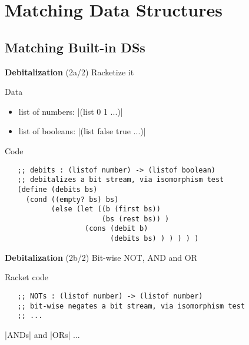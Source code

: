 \documentclass[12pt]{beamer}
\begin{document}
\section{Matching Data Structures}

\subsection{Matching Built-in DSs}

\begin{frame}[fragile]{{\bf Debitalization} (2a/2)}
 Racketize it

 \pause

 Data
 \begin{itemize}
  \item list of numbers: |(list 0 1 ...)|
  \item list of booleans: |(list false true ...)|
 \end{itemize}

 \pause

 Code
 {\scriptsize
  \begin{verbatim}
   ;; debits : (listof number) -> (listof boolean)
   ;; debitalizes a bit stream, via isomorphism test
   (define (debits bs)
     (cond ((empty? bs) bs)
           (else (let ((b (first bs))
                       (bs (rest bs)) )
                   (cons (debit b)
                         (debits bs) ) ) ) ) )
  \end{verbatim}
 }
\end{frame}

\begin{frame}[fragile]{{\bf Debitalization} (2b/2)}
 Bit-wise NOT, AND and OR

 \pause
 
 Racket code
 {\scriptsize
  \begin{verbatim}
   ;; NOTs : (listof number) -> (listof number)
   ;; bit-wise negates a bit stream, via isomorphism test
   ;; ...
  \end{verbatim}
 }

 \pause

 |ANDs| and |ORs| ...
\end{frame}
\end{document}
